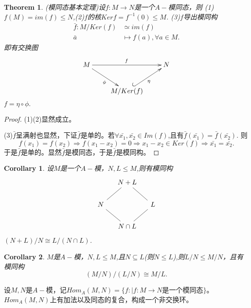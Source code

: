 \documentclass[UTF8]{article}
\newtheorem{thm}{Theorem}[section]
\newtheorem{cor}{Corollary}[section]
\begin{document}
\begin{thm}
	(模同态基本定理)设$f:M\rightarrow N$是一个$A-$模同态，则
	(1)$f(M)=im(f)\leq N$,(2)$f$的核$Kerf=f^{-1}(0)\leq M$.
	(3)$f$导出模同构
	\[
	\begin{split}
	\bar{f}:M/Ker(f)&\simeq im(f)\\
	\bar{a}&\longmapsto f(a),\forall a\in M.
	\end{split}
	\]
	即有交换图
	$$
	\xymatrix{
		M\ar[rd]_{\phi}\ar[rr]^{f}& &N\\
		&M/Ker(f)\ar@{^{(}->}[ru]_{\eta}&	
	}
	$$	
	$f=\eta\circ \phi.$
\end{thm}
\begin{proof}
	(1)(2)显然成立。
	
	(3)$\bar{f}$呈满射也显然，下证$\bar{f}$是单的。若$\forall \bar{x_{1}},\bar{x_{2}}\in Im(f)$,且有$\bar{f}(\bar{x_{1}})=\bar{f}(\bar{x_{2}})$.
	则$$
	f(x_{1})=f(x_{2})\Rightarrow f(x_{1}-x_{2})=0\Rightarrow x_{1}-x_{2}\in Ker(f)\Rightarrow \bar{x_{1}}=\bar{x_{2}}.
	$$
	于是$\bar{f}$是单的。显然$\bar{f}$是模同态，于是$\bar{f}$是模同构。
\end{proof}
\begin{cor}
	设$M$是一个$A-$模，$N,L\leq M$,则有模同构
	\[
	\begin{tikzcd}[column sep=small]
	& N+L \arrow[dash,ld] \arrow[dash,rd] & \\
	N \arrow[dash,rd] & & L \arrow[dash,ld] \\
	& N\cap L &
	\end{tikzcd}\]
	$(N+L)/N\cong L/(N\cap L)$.
\end{cor}
\begin{cor}
	$M$是$A-$模，$N,L\leq M$,且$N\subseteq L$(则$N\leq L$),则$L/N\leq M/N$，且有模同构
	$$
	(M/N)/(L/N)\cong M/L.
	$$
\end{cor}
设$M,N$是$A-$模，记$Hom_{A}(M,N)=\{f:|f:M\rightarrow N\text{是一个模同态}\}$。$Hom_{A}(M,N)$上有加法以及同态的复合，构成一个非交换环。
\end{document}

